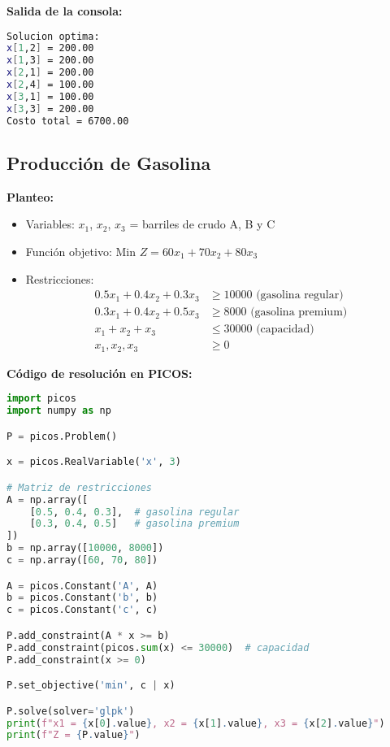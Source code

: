 \documentclass[12pt]{article}
\begin{document}
\textbf{Salida de la consola:}
\begin{lstlisting}[language=bash,backgroundcolor=\color{black},basicstyle=\color{white}\ttfamily,numbers=none]
Solucion optima:
x[1,2] = 200.00
x[1,3] = 200.00
x[2,1] = 200.00
x[2,4] = 100.00
x[3,1] = 100.00
x[3,3] = 200.00
Costo total = 6700.00
\end{lstlisting}

\subsection{Producción de Gasolina}

\textbf{Planteo:}
\begin{itemize}
\item Variables: $x_1$, $x_2$, $x_3$ = barriles de crudo A, B y C
\item Función objetivo: Min $Z = 60x_1 + 70x_2 + 80x_3$
\item Restricciones:
  \begin{align*}
  0.5x_1 + 0.4x_2 + 0.3x_3 &\geq 10000 \text{ (gasolina regular)} \\
  0.3x_1 + 0.4x_2 + 0.5x_3 &\geq 8000 \text{ (gasolina premium)} \\
  x_1 + x_2 + x_3 &\leq 30000 \text{ (capacidad)} \\
  x_1, x_2, x_3 &\geq 0
  \end{align*}
\end{itemize}

\textbf{Código de resolución en PICOS:}
\begin{lstlisting}[language=Python]
import picos
import numpy as np

P = picos.Problem()

x = picos.RealVariable('x', 3)

# Matriz de restricciones
A = np.array([
    [0.5, 0.4, 0.3],  # gasolina regular
    [0.3, 0.4, 0.5]   # gasolina premium
])
b = np.array([10000, 8000])
c = np.array([60, 70, 80])

A = picos.Constant('A', A)
b = picos.Constant('b', b)
c = picos.Constant('c', c)

P.add_constraint(A * x >= b)
P.add_constraint(picos.sum(x) <= 30000)  # capacidad
P.add_constraint(x >= 0)

P.set_objective('min', c | x)

P.solve(solver='glpk')
print(f"x1 = {x[0].value}, x2 = {x[1].value}, x3 = {x[2].value}")
print(f"Z = {P.value}")
\end{lstlisting}
\end{document}

